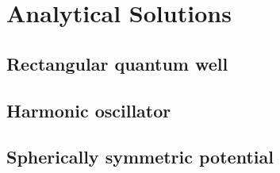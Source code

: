 \section{Analytical Solutions}
	\subsection{Rectangular quantum well}
	\subsection{Harmonic oscillator}
	\subsection{Spherically symmetric potential}
